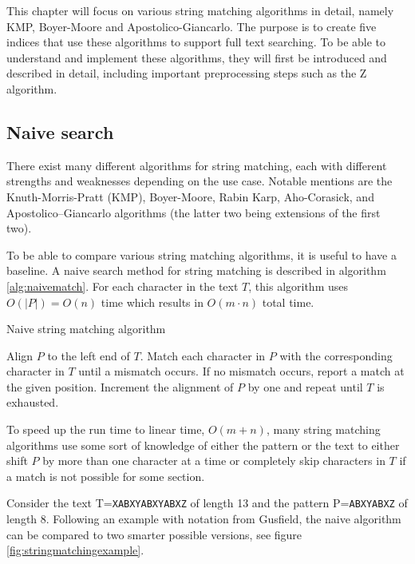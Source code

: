 This chapter will focus on various string matching algorithms in detail, namely KMP, Boyer-Moore and Apostolico-Giancarlo. The purpose is to create five indices that use these algorithms to support full text searching. To be able to understand and implement these algorithms, they will first be introduced and described in detail, including important preprocessing steps such as the Z algorithm. 

\subsection{Naive search}

There exist many different algorithms for string matching, each with different strengths and weaknesses depending on the use case. Notable mentions are the Knuth-Morris-Pratt (KMP), Boyer-Moore, Rabin Karp, Aho-Corasick, and Apostolico–Giancarlo algorithms (the latter two being extensions of the first two). 

To be able to compare various string matching algorithms, it is useful to have a baseline. A naive search method for string matching is described in algorithm \ref{alg:naivematch}. For each character in the text $T$, this algorithm uses $O(|P|)=O(n)$ time which results in $O(m\cdot n)$ total time. 

\begin{algorithm}[t]
\caption{Naive string matching algorithm}\label{alg:naivematch}
\begin{algorithmic}
\State Align $P$ to the left end of $T$.
\State Match each character in $P$ with the corresponding character in $T$ until a mismatch occurs.
\State If no mismatch occurs, report a match at the given position.
\State Increment the alignment of $P$ by one and repeat until $T$ is exhausted. 
\end{algorithmic}
\end{algorithm}

To speed up the run time to linear time, $O(m+n)$, many string matching  algorithms use some sort of knowledge of either the pattern or the text to either shift $P$ by more than one character at a time or completely skip characters in $T$ if a match is not possible for some section.

Consider the text T=\verb|XABXYABXYABXZ| of length 13 and the pattern P=\verb|ABXYABXZ| of length 8. Following an example with notation from Gusfield\cite{Gusfield1997AlgorithmsOS}, the naive algorithm can be compared to two smarter possible versions, see figure \ref{fig:stringmatchingexample}. 


